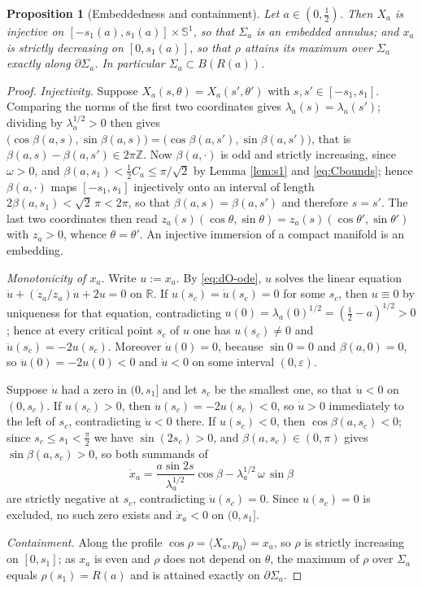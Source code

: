 \documentclass[11pt,a4paper]{amsart}
\theoremstyle{plain}
\newtheorem{proposition}[theorem]{Proposition}
\theoremstyle{definition}
\newcommand{\R}{\mathbb{R}}
\newcommand{\Sph}{\mathbb{S}}
\begin{document}
\begin{proposition}[Embeddedness and containment]\label{prop:embcont}
Let $a\in(0,\tfrac12)$. Then $X_a$ is injective on $[-s_1(a),s_1(a)]\times\Sph^1$, so that $\Sigma_a$ is an embedded annulus; and $x_a$ is strictly decreasing on $[0,s_1(a)]$, so that $\rho$ attains its maximum over $\Sigma_a$ exactly along $\partial\Sigma_a$. In particular $\Sigma_a\subset B(R(a))$.
\end{proposition}

\begin{proof}
\emph{Injectivity.} Suppose $X_a(s,\theta)=X_a(s',\theta')$ with $s,s'\in[-s_1,s_1]$. Comparing the norms of the first two coordinates gives $\lambda_a(s)=\lambda_a(s')$; dividing by $\lambda_a^{1/2}>0$ then gives $\bigl(\cos\beta(a,s),\sin\beta(a,s)\bigr)=\bigl(\cos\beta(a,s'),\sin\beta(a,s')\bigr)$, that is $\beta(a,s)-\beta(a,s')\in 2\pi\mathbb{Z}$. Now $\beta(a,\cdot)$ is odd and strictly increasing, since $\omega>0$, and $\beta(a,s_1)<\tfrac12 C_a\leq\pi/\sqrt2$ by Lemma \ref{lem:s1} and \eqref{eq:Cbounds}; hence $\beta(a,\cdot)$ maps $[-s_1,s_1]$ injectively onto an interval of length $2\beta(a,s_1)<\sqrt2\,\pi<2\pi$, so that $\beta(a,s)=\beta(a,s')$ and therefore $s=s'$. The last two coordinates then read $z_a(s)(\cos\theta,\sin\theta)=z_a(s)(\cos\theta',\sin\theta')$ with $z_a>0$, whence $\theta=\theta'$. An injective immersion of a compact manifold is an embedding.

\emph{Monotonicity of $x_a$.} Write $u:=x_a$. By \eqref{eq:dO-ode}, $u$ solves the linear equation $\ddot u+(\dot z_a/z_a)\dot u+2u=0$ on $\R$. If $u(s_c)=\dot u(s_c)=0$ for some $s_c$, then $u\equiv 0$ by uniqueness for that equation, contradicting $u(0)=\lambda_a(0)^{1/2}=(\tfrac12-a)^{1/2}>0$; hence at every critical point $s_c$ of $u$ one has $u(s_c)\neq 0$ and $\ddot u(s_c)=-2u(s_c)$. Moreover $\dot u(0)=0$, because $\sin 0=0$ and $\beta(a,0)=0$, so $\ddot u(0)=-2u(0)<0$ and $\dot u<0$ on some interval $(0,\varepsilon)$.

Suppose $\dot u$ had a zero in $(0,s_1]$ and let $s_c$ be the smallest one, so that $\dot u<0$ on $(0,s_c)$. If $u(s_c)>0$, then $\ddot u(s_c)=-2u(s_c)<0$, so $\dot u>0$ immediately to the left of $s_c$, contradicting $\dot u<0$ there. If $u(s_c)<0$, then $\cos\beta(a,s_c)<0$; since $s_c\leq s_1<\tfrac\pi2$ we have $\sin(2s_c)>0$, and $\beta(a,s_c)\in(0,\pi)$ gives $\sin\beta(a,s_c)>0$, so both summands of
\[
\dot x_a=\frac{a\sin 2s}{\lambda_a^{1/2}}\cos\beta-\lambda_a^{1/2}\,\omega\,\sin\beta
\]
are strictly negative at $s_c$, contradicting $\dot u(s_c)=0$. Since $u(s_c)=0$ is excluded, no such zero exists and $\dot x_a<0$ on $(0,s_1]$.

\emph{Containment.} Along the profile $\cos\rho=\langle X_a,p_0\rangle=x_a$, so $\rho$ is strictly increasing on $[0,s_1]$; as $x_a$ is even and $\rho$ does not depend on $\theta$, the maximum of $\rho$ over $\Sigma_a$ equals $\rho(s_1)=R(a)$ and is attained exactly on $\partial\Sigma_a$.
\end{proof}
\end{document}
